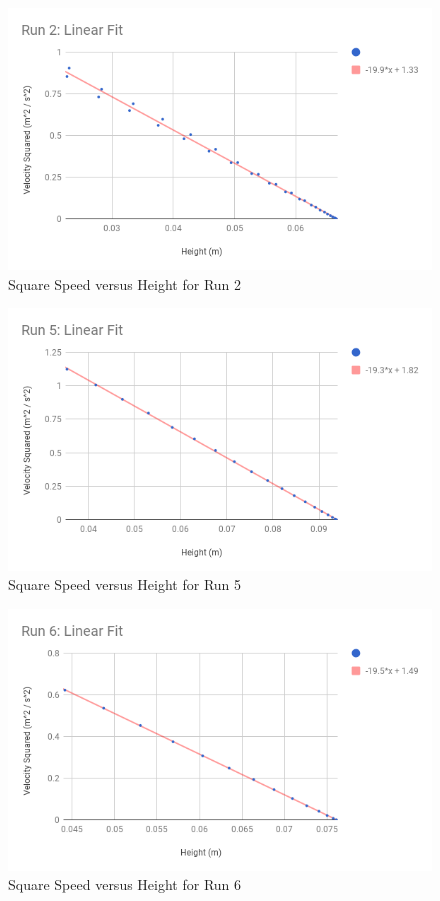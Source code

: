 \begin{figure}[ht]
    \centering
    \includegraphics[scale=0.71]{image/07-mechanic/run-2-fit.png}
    \caption{Square Speed versus Height for Run 2}
    \label{figure.07.run.2.fit}
\end{figure}
\begin{figure}[ht]
    \centering
    \includegraphics[scale=0.71]{image/07-mechanic/run-5-fit.png}
    \caption{Square Speed versus Height for Run 5}
    \label{figure.07.run.5.fit}
\end{figure}
\begin{figure}[ht]
    \centering
    \includegraphics[scale=0.71]{image/07-mechanic/run-6-fit.png}
    \caption{Square Speed versus Height for Run 6}
    \label{figure.07.run.6.fit}
\end{figure}
